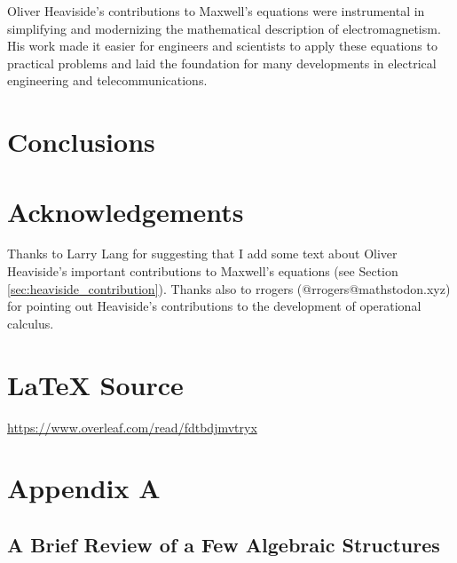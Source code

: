 \documentclass{article}
\theoremstyle{definition}
\begin{document}
\bigskip
\noindent
Oliver Heaviside's contributions to Maxwell's equations were
instrumental in simplifying and modernizing the mathematical
description of electromagnetism. His work made it easier for
engineers and scientists to apply these equations to practical
problems and laid the foundation for many developments in
electrical engineering and telecommunications.
%
%
%
\section{Conclusions}
\label{sec:conclusions}
%
%
%
\section{Acknowledgements}
\label{sec:acknowledgements}
Thanks to Larry Lang for suggesting that I add some text about 
Oliver Heaviside's important contributions to Maxwell's equations 
(see Section \ref{sec:heaviside_contribution}). Thanks also
to rrogers (@rrogers@mathstodon.xyz) for pointing out Heaviside's
contributions to the development of operational calculus.
%
%
\section*{\LaTeX \hspace{0.025 mm} Source}
\url{https://www.overleaf.com/read/fdtbdjmvtryx}
%
%
%


%
%
\section*{Appendix A}
\subsection*{A Brief Review of a Few Algebraic Structures}
\end{document}
